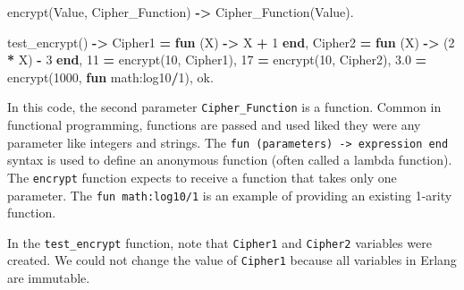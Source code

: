 \documentclass[
]{book}
\newenvironment{Shaded}{\begin{snugshade}}{\end{snugshade}}
\newcommand{\CharTok}[1]{\textcolor[rgb]{0.31,0.60,0.02}{#1}}
\newcommand{\DecValTok}[1]{\textcolor[rgb]{0.00,0.00,0.81}{#1}}
\newcommand{\FloatTok}[1]{\textcolor[rgb]{0.00,0.00,0.81}{#1}}
\newcommand{\FunctionTok}[1]{\textcolor[rgb]{0.00,0.00,0.00}{#1}}
\newcommand{\KeywordTok}[1]{\textcolor[rgb]{0.13,0.29,0.53}{\textbf{#1}}}
\newcommand{\OperatorTok}[1]{\textcolor[rgb]{0.81,0.36,0.00}{\textbf{#1}}}
\newcommand{\VariableTok}[1]{\textcolor[rgb]{0.00,0.00,0.00}{#1}}
\begin{document}
\begin{Shaded}
\begin{Highlighting}[]
\FunctionTok{encrypt(}\VariableTok{Value}\FunctionTok{,} \VariableTok{Cipher\_Function}\FunctionTok{)} \OperatorTok{{-}\textgreater{}} \VariableTok{Cipher\_Function}\FunctionTok{(}\VariableTok{Value}\FunctionTok{).}

\FunctionTok{test\_encrypt()} \OperatorTok{{-}\textgreater{}}
   \VariableTok{Cipher1} \OperatorTok{=} \KeywordTok{fun} \FunctionTok{(}\VariableTok{X}\FunctionTok{)} \OperatorTok{{-}\textgreater{}} \VariableTok{X} \OperatorTok{+} \DecValTok{1} \KeywordTok{end}\FunctionTok{,}
   \VariableTok{Cipher2} \OperatorTok{=} \KeywordTok{fun} \FunctionTok{(}\VariableTok{X}\FunctionTok{)} \OperatorTok{{-}\textgreater{}} \FunctionTok{(}\DecValTok{2} \OperatorTok{*} \VariableTok{X}\FunctionTok{)} \OperatorTok{{-}} \DecValTok{3} \KeywordTok{end}\FunctionTok{,}
   \DecValTok{11} \OperatorTok{=} \FunctionTok{encrypt(}\DecValTok{10}\FunctionTok{,} \VariableTok{Cipher1}\FunctionTok{),}
   \DecValTok{17} \OperatorTok{=} \FunctionTok{encrypt(}\DecValTok{10}\FunctionTok{,} \VariableTok{Cipher2}\FunctionTok{),}
   \FloatTok{3.0} \OperatorTok{=} \FunctionTok{encrypt(}\DecValTok{1000}\FunctionTok{,} \KeywordTok{fun} \FunctionTok{math:log10}\OperatorTok{/}\DecValTok{1}\FunctionTok{),}
   \CharTok{ok}\FunctionTok{.}
\end{Highlighting}
\end{Shaded}

In this code, the second parameter \texttt{Cipher\_Function} is a function. Common in functional programming, functions are passed and used liked they were any parameter like integers and strings. The \texttt{fun\ (parameters)\ -\textgreater{}\ expression\ end} syntax is used to define an anonymous function (often called a lambda function). The \texttt{encrypt} function expects to receive a function that takes only one parameter. The \texttt{fun\ math:log10/1} is an example of providing an existing 1-arity function.

In the \texttt{test\_encrypt} function, note that \texttt{Cipher1} and \texttt{Cipher2} variables were created. We could not change the value of \texttt{Cipher1} because all variables in Erlang are immutable.
\end{document}

